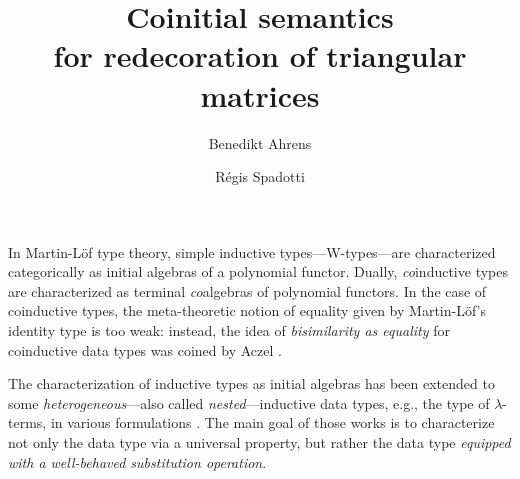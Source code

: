 \documentclass{easychair}
\begin{document}
\title{Coinitial semantics \\ for redecoration of triangular matrices}

\author{Benedikt Ahrens \and R\'egis Spadotti}



\maketitle




 In Martin-L\"of type theory, simple inductive types---\textsf{W}-types---are characterized categorically as initial algebras of
 a polynomial functor.
 Dually, \emph{co}inductive types are characterized as terminal \emph{co}algebras of polynomial functors.
 In the case of coinductive types, the meta-theoretic notion of equality given by Martin-L\"of's identity type is too weak: instead, the idea of 
 \emph{bisimilarity as equality} for coinductive data types was coined by Aczel \cite{aczel_nonwellfounded}.

 
 The characterization of inductive types as initial algebras 
 has been extended to some \emph{heterogeneous}---also called \emph{nested}---inductive data types, e.g., the type of $\lambda$-terms,
 in various formulations \cite{fpt, DBLP:journals/iandc/HirschowitzM10}.
 The main goal of those works is to characterize not only the data type via a universal property, but rather the data type
 \emph{equipped with a well-behaved substitution operation}.
 
 
\end{document}
